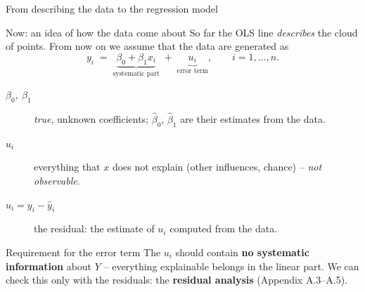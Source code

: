 \documentclass[aspectratio=169,11pt]{beamer}
\begin{document}
\begin{frame}{From describing the data to the regression model}
  \begin{block}{Now: an idea of how the data come about}
    So far the OLS line \emph{describes} the cloud of points. From now on we
    assume that the data are generated as
    \vspace{-6pt}
    \[
      y_i \;=\; \underbrace{\beta_0 + \beta_1 x_i}_{\text{systematic part}}
             \;+\; \underbrace{u_i}_{\text{error term}},
      \qquad i=1,\dots,n .
    \]
    \vspace{-10pt}
    \begin{description}
      \item[$\beta_0,\ \beta_1$] \emph{true}, unknown coefficients;
            $\hat{\beta}_0$, $\hat{\beta}_1$ are their estimates from the data.
      \item[$u_i$] everything that $x$ does not explain (other influences,
            chance) -- \emph{not observable}.
      \item[$\hat{u}_i = y_i - \hat{y}_i$] the residual: the estimate of $u_i$
            computed from the data.
    \end{description}
  \end{block}

  \begin{alertblock}{Requirement for the error term}
    The $u_i$ should contain \textbf{no systematic information} about $Y$ --
    everything explainable belongs in the linear part. We can check this only
    with the residuals: the \textbf{residual analysis} (Appendix A.3--A.5).
  \end{alertblock}
\end{frame}
\end{document}
